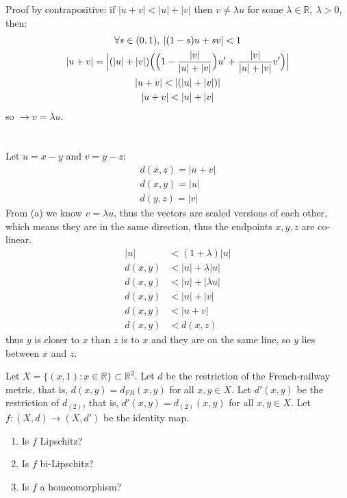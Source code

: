 \documentclass{jhwhw}
\begin{document}
\solution{}

\part{}

Proof by contrapositive: if $|u + v| < |u| + |v|$ then $v \neq \lambda u$ for some $\lambda \in \mathbb{R}, \: \lambda >0$, then:
\begin{gather}
\forall s \in (0,1), \: |(1-s)u + sv| < 1\\
|u + v| = \Big|(|u| + |v|) \Big{(} \Big{(}1 - \frac{|v|}{|u| + |v|}\Big{) }u' + \frac{|v|}{|u|+ |v|} v' \Big{)} \Big|\\
|u+v|< |(|u| + |v|)| \\
|u + v| < |u| + |v|
\end{gather}
so $\to v = \lambda u$.


\part{}
Let $u = x-y$ and $v = y-z$:
\begin{gather}
d(x,z) = |u + v|\\
d(x,y) = |u|\\
d(y,z) = |v|
\end{gather}
From (a) we know $v = \lambda u$, thus the vectors are scaled versions of each other, which means they are in the same direction, thus the endpoints $x,y,z$ are co-linear.
\begin{align}
|u| &< (1+\lambda) |u|\\
d(x,y) &< |u| + \lambda |u|\\
d(x,y) &< |u| + |\lambda u|\\
d(x,y) &< |u| +|v|\\
d(x,y) &< |u+v|\\
d(x,y) &< d(x,z)
\end{align}
thus $y$ is closer to $x$ than $z$ is to $x$ and they are on the same line, so $y$ lies between $x$ and $z$.


\problem{}%
 Let $X = \{ (x,1):x\in\mathbb{R}\}\subset\mathbb{R}^2$. Let $d$ be the restriction of the French-railway metric, that is, $d(x,y) = d_{FR}(x,y)$ for all $x,y\in X$.  Let $d'(x,y)$ be the restriction of  $d_{(2)}$, that is, $d'(x,y) = d_{(2)}(x,y)$ for all $x,y\in X$.   Let $f:(X,d)\to (X,d')$ be the identity map.

\begin{enumerate}
	\item Is $f$ Lipschitz?
	\item Is $f$ bi-Lipschitz?
	\item Is $f$ a homeomorphism?
\end{enumerate}
\end{document}
